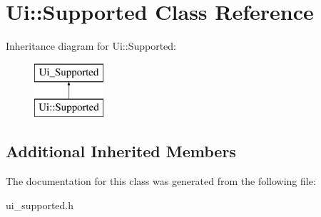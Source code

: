 \hypertarget{classUi_1_1Supported}{\section{Ui\-:\-:Supported Class Reference}
\label{classUi_1_1Supported}
}
Inheritance diagram for Ui\-:\-:Supported\-:\begin{figure}[H]
\begin{center}
\leavevmode
\includegraphics[height=2.000000cm]{classUi_1_1Supported}
\end{center}
\end{figure}
\subsection*{Additional Inherited Members}


The documentation for this class was generated from the following file\-:\begin{DoxyCompactItemize}
\item 
ui\-\_\-supported.\-h\end{DoxyCompactItemize}
